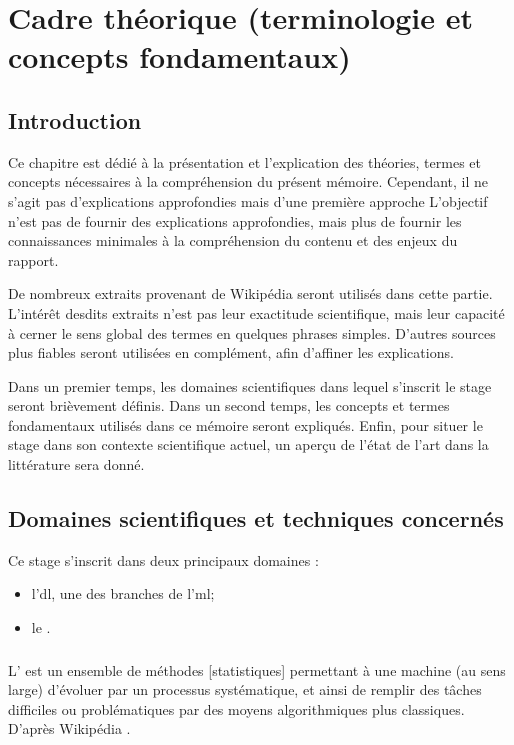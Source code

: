 \chapter[Cadre théorique]{Cadre théorique (terminologie et concepts fondamentaux) \label{ch:sci_framework}}

\section{Introduction} %
Ce chapitre est dédié à la présentation et l'explication des théories, termes et concepts nécessaires à la compréhension du présent mémoire.
Cependant, il ne s'agit pas d'explications approfondies mais d'une première approche %
L'objectif n'est pas de fournir des explications approfondies, mais plus de fournir les connaissances minimales à la compréhension du contenu et des enjeux du rapport.

De nombreux extraits provenant de Wikipédia seront utilisés dans cette partie. L'intérêt desdits extraits n'est pas leur exactitude scientifique, mais leur capacité à cerner le sens global des termes en quelques phrases simples.
D'autres sources plus fiables seront utilisées en complément, afin d'affiner les explications. 

Dans un premier temps, les domaines scientifiques dans lequel s'inscrit le stage seront brièvement définis.
Dans un second temps, les concepts et termes fondamentaux utilisés dans ce mémoire seront expliqués.
Enfin, pour situer le stage dans son contexte scientifique actuel, un aperçu de l'état de l'art dans la littérature sera donné.

\section{Domaines scientifiques et techniques concernés} %
Ce stage s'inscrit dans deux principaux domaines :
\begin{itemize}
	\item l'\gls{dl}, une des branches de l'\gls{ml};
	\item le .
\end{itemize}

\subsection{} \label{subsec:ml}\label{def:ml}
L' est un ensemble de \og méthodes [statistiques] permettant à une machine (au sens large) d'évoluer par un processus systématique, et ainsi de remplir des tâches difficiles ou problématiques par des moyens algorithmiques plus classiques\fg{}. D'après Wikipédia .

